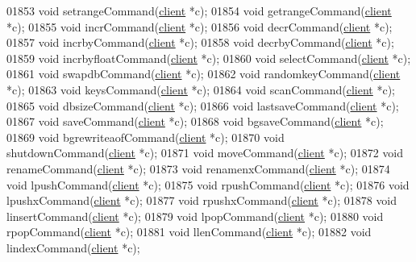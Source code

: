 \begin{DoxyCode}
{{{{{{{01853 \textcolor{keywordtype}{void} setrangeCommand(\hyperlink{structclient}{client} *c);
01854 \textcolor{keywordtype}{void} getrangeCommand(\hyperlink{structclient}{client} *c);
01855 \textcolor{keywordtype}{void} incrCommand(\hyperlink{structclient}{client} *c);
01856 \textcolor{keywordtype}{void} decrCommand(\hyperlink{structclient}{client} *c);
01857 \textcolor{keywordtype}{void} incrbyCommand(\hyperlink{structclient}{client} *c);
01858 \textcolor{keywordtype}{void} decrbyCommand(\hyperlink{structclient}{client} *c);
01859 \textcolor{keywordtype}{void} incrbyfloatCommand(\hyperlink{structclient}{client} *c);
01860 \textcolor{keywordtype}{void} selectCommand(\hyperlink{structclient}{client} *c);
01861 \textcolor{keywordtype}{void} swapdbCommand(\hyperlink{structclient}{client} *c);
01862 \textcolor{keywordtype}{void} randomkeyCommand(\hyperlink{structclient}{client} *c);
01863 \textcolor{keywordtype}{void} keysCommand(\hyperlink{structclient}{client} *c);
01864 \textcolor{keywordtype}{void} scanCommand(\hyperlink{structclient}{client} *c);
01865 \textcolor{keywordtype}{void} dbsizeCommand(\hyperlink{structclient}{client} *c);
01866 \textcolor{keywordtype}{void} lastsaveCommand(\hyperlink{structclient}{client} *c);
01867 \textcolor{keywordtype}{void} saveCommand(\hyperlink{structclient}{client} *c);
01868 \textcolor{keywordtype}{void} bgsaveCommand(\hyperlink{structclient}{client} *c);
01869 \textcolor{keywordtype}{void} bgrewriteaofCommand(\hyperlink{structclient}{client} *c);
01870 \textcolor{keywordtype}{void} shutdownCommand(\hyperlink{structclient}{client} *c);
01871 \textcolor{keywordtype}{void} moveCommand(\hyperlink{structclient}{client} *c);
01872 \textcolor{keywordtype}{void} renameCommand(\hyperlink{structclient}{client} *c);
01873 \textcolor{keywordtype}{void} renamenxCommand(\hyperlink{structclient}{client} *c);
01874 \textcolor{keywordtype}{void} lpushCommand(\hyperlink{structclient}{client} *c);
01875 \textcolor{keywordtype}{void} rpushCommand(\hyperlink{structclient}{client} *c);
01876 \textcolor{keywordtype}{void} lpushxCommand(\hyperlink{structclient}{client} *c);
01877 \textcolor{keywordtype}{void} rpushxCommand(\hyperlink{structclient}{client} *c);
01878 \textcolor{keywordtype}{void} linsertCommand(\hyperlink{structclient}{client} *c);
01879 \textcolor{keywordtype}{void} lpopCommand(\hyperlink{structclient}{client} *c);
01880 \textcolor{keywordtype}{void} rpopCommand(\hyperlink{structclient}{client} *c);
01881 \textcolor{keywordtype}{void} llenCommand(\hyperlink{structclient}{client} *c);
01882 \textcolor{keywordtype}{void} lindexCommand(\hyperlink{structclient}{client} *c);
}}}}}}}
\end{DoxyCode}
